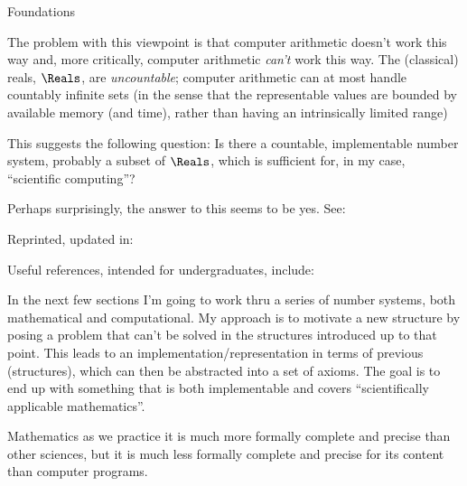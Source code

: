 \documentclass[12pt]{PalisadesLakesBook}
\begin{document}
\begin{plSection}{Foundations}

The problem with this viewpoint is that computer arithmetic
doesn't work this way
and, more critically, computer arithmetic \emph{can't} work
this way.
The (classical) reals, $\Reals$, are \emph{uncountable};
computer arithmetic can at most handle countably infinite sets
(in the sense that the representable values are 
bounded by available memory (and time),
rather than having an intrinsically limited range)

This suggests the following question:
Is there a countable, implementable number system,
probably a subset of $\Reals$,
which is sufficient for, in my case,
``scientific computing''?

Perhaps surprisingly, the answer to this seems to be yes.
See: 



Reprinted, updated in:




Useful references, intended for undergraduates, include:
 



In the next few sections I'm going to work thru a series
of number systems, both mathematical and computational.
My approach is to motivate a new structure
by posing a problem that can't be solved in the structures
introduced up to that point.
This leads to an implementation/representation
in terms of previous (structures),
which can then be abstracted into a set of axioms.
The goal is to end up with something that is both
implementable and covers ``scientifically applicable mathematics''.

\begin{plQuote}
{}{}%
{Mathematics as we practice it is much more formally 
complete and precise than
other sciences, but it is much less formally complete and precise 
for its content than computer programs.
}
\end{plQuote}


\end{plSection}
\end{document}
